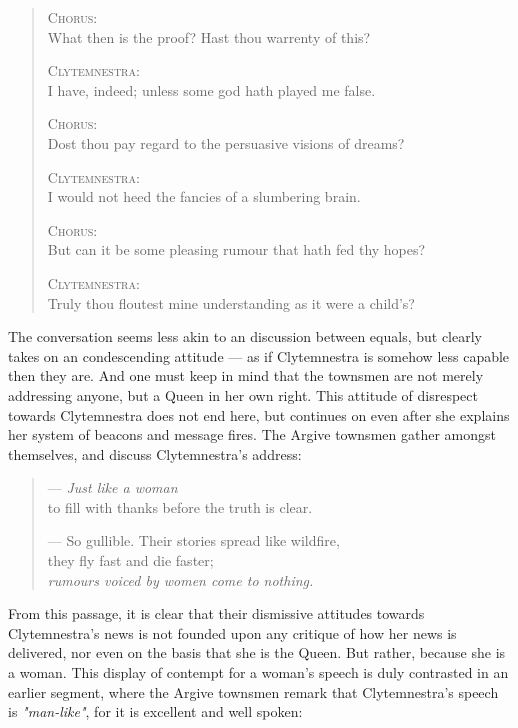 \begin{quote}
  \textsc{Chorus}: \\
  What then is the proof? Hast thou warrenty of this?

  \textsc{Clytemnestra}: \\
  I have, indeed; unless some god hath played me false.

  \textsc{Chorus}: \\
  Dost thou pay regard to the persuasive visions of dreams?

  \textsc{Clytemnestra}: \\
  I would not heed the fancies of a slumbering brain.

  \textsc{Chorus}: \\
  But can it be some pleasing rumour that hath fed thy hopes?

  \textsc{Clytemnestra}: \\
  Truly thou floutest mine understanding as it were a child's?

  \autocite[275]{loeb}
\end{quote}

\noindent
The conversation seems less akin to an discussion between equals, but clearly
takes on an condescending attitude --- as if Clytemnestra is somehow less
capable then they are. And one must keep in mind that the townsmen are
not merely addressing anyone, but a Queen in her own right. This attitude of
disrespect towards Clytemnestra does not end here, but continues on even after
she explains her system of beacons and message fires. The Argive townsmen gather
amongst themselves, and discuss Clytemnestra's address:

\begin{quote}
  --- \emph{Just like a woman} \\
  to fill with thanks before the truth is clear.

  --- So gullible. Their stories spread like wildfire, \\
  they fly fast and die faster; \\
  \emph{rumours voiced by women come to nothing.}

  \autocite[474]{fagles}
\end{quote}

\noindent
From this passage, it is clear that their dismissive attitudes towards
Clytemnestra's news is not founded upon any critique of how her news is
delivered, nor even on the basis that she is the Queen. But rather, because she
is a woman. This display of contempt for a woman's speech is duly contrasted in
an earlier segment, where the Argive townsmen remark that Clytemnestra's
speech is \emph{"man-like"}, for it is excellent and well spoken:

